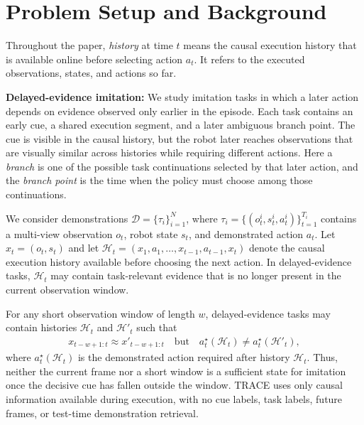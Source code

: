 \documentclass{article}
\begin{document}

\section{Problem Setup and Background}
\label{sec:setup_notation}

Throughout the paper, \emph{history} at time $t$ means the causal execution history that is available online before selecting action $a_t$. It refers to the executed observations, states, and actions so far.

\textbf{Delayed-evidence imitation:}
We study imitation tasks in which a later action depends on evidence observed only earlier in the episode. Each task contains an early cue, a shared execution segment, and a later ambiguous branch point. The cue is visible in the causal history, but the robot later reaches observations that are visually similar across histories while requiring different actions. Here a \emph{branch} is one of the possible task continuations selected by that later action, and the \emph{branch point} is the time when the policy must choose among those continuations.

We consider demonstrations $\mathcal{D}=\{\tau_i\}_{i=1}^{N}$, where $\tau_i=\{(o_t^i,s_t^i,a_t^i)\}_{t=1}^{T_i}$ contains a multi-view observation $o_t$, robot state $s_t$, and demonstrated action $a_t$. Let $x_t=(o_t,s_t)$ and let $\mathcal{H}_t=(x_1,a_1,\ldots,x_{t-1},a_{t-1},x_t)$ denote the causal execution history available before choosing the next action. In delayed-evidence tasks, $\mathcal{H}_t$ may contain task-relevant evidence that is no longer present in the current observation window.

For any short observation window of length $w$, delayed-evidence tasks may contain histories $\mathcal{H}_t$ and $\mathcal{H}'_t$ such that
\begin{align}
    x_{t-w+1:t} \approx x'_{t-w+1:t}
    \quad\text{but}\quad
    a_t^\star(\mathcal{H}_t) \neq a_t^\star(\mathcal{H}'_t),
    \label{eq:delayed_evidence_setup}
\end{align}
where $a_t^\star(\mathcal{H}_t)$ is the demonstrated action required after history $\mathcal{H}_t$. Thus, neither the current frame nor a short window is a sufficient state for imitation once the decisive cue has fallen outside the window. TRACE uses only causal information available during execution, with no cue labels, task labels, future frames, or test-time demonstration retrieval.
\end{document}
